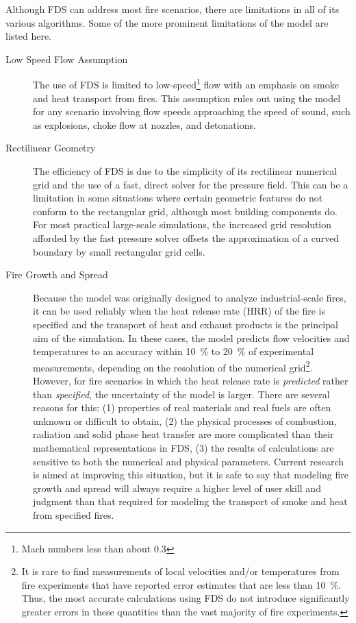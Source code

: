 \documentclass[11pt]{book}
\begin{document}
Although FDS can address most fire scenarios, there are limitations in all of its various algorithms. Some of the more prominent limitations of the
model are listed here.
\begin{description}
\item[Low Speed Flow Assumption] The use of FDS is limited to low-speed\footnote{Mach numbers less than about 0.3} flow with an emphasis on smoke and heat transport from fires. This assumption rules out using the model for any scenario involving flow speeds approaching the speed of sound, such as explosions, choke flow at nozzles, and detonations.
\item[Rectilinear Geometry] The efficiency of FDS is due to the simplicity of its rectilinear numerical grid and the use of a fast, direct solver for the pressure field. This can be a limitation in some situations where certain geometric features do not conform to the rectangular grid, although most building components do. For most practical large-scale simulations, the increased grid resolution afforded by the fast pressure solver offsets the approximation of a curved boundary by small rectangular grid cells.
\item[Fire Growth and Spread] Because the model was originally designed to analyze industrial-scale fires, it can be used reliably when the heat release rate (HRR) of the fire is specified and the transport of heat and exhaust products is the principal aim of the simulation. In these cases, the model predicts flow velocities and temperatures to an accuracy within 10~\% to 20~\% of experimental measurements, depending on the resolution of the numerical grid\footnote{It is rare to find measurements of local velocities and/or temperatures from fire experiments that have reported error estimates that are less than 10~\%. Thus, the most accurate calculations using FDS do not introduce significantly greater errors in these quantities than the vast majority of fire experiments.}. However, for fire scenarios in which the heat release rate is {\em predicted} rather than {\em specified}, the uncertainty of the model is larger. There are several reasons for this: (1) properties of real materials and real fuels are often unknown or difficult to obtain, (2) the physical processes of combustion, radiation and solid phase heat transfer are more complicated than their mathematical representations in FDS, (3) the results of calculations are sensitive to both the numerical and physical parameters. Current research is aimed at improving this situation, but it is safe to say that modeling fire growth and spread will always require a higher level of user skill and judgment than that required for modeling the transport of smoke and heat from specified fires.

\end{description}
\end{document}
